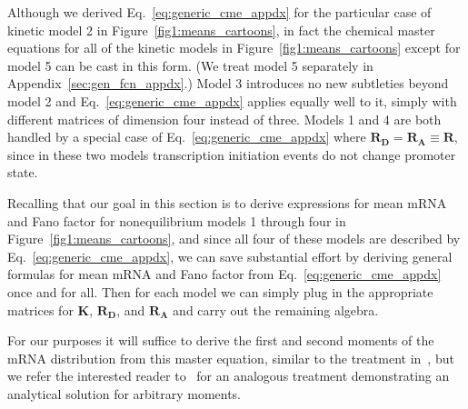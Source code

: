 Although we derived Eq.~\ref{eq:generic_cme_appdx} for the particular case of
kinetic model 2 in Figure~\ref{fig1:means_cartoons}, in fact the chemical master
equations for all of the kinetic models in Figure~\ref{fig1:means_cartoons}
except for model 5 can be cast in this form. (We treat model 5 separately in
Appendix~\ref{sec:gen_fcn_appdx}.) Model 3 introduces no new subtleties beyond
model 2 and Eq.~\ref{eq:generic_cme_appdx} applies equally well to it, simply
with different matrices of dimension four instead of three. Models 1 and 4 are
both handled by a special case of Eq.~\ref{eq:generic_cme_appdx} where
$\mathbf{R_D} = \mathbf{R_A} \equiv \mathbf{R}$, since in these two models
transcription initiation events do not change promoter state.

Recalling that our goal in this section is to derive expressions for mean mRNA
and Fano factor for nonequilibrium models 1 through four in
Figure~\ref{fig1:means_cartoons}, and since all four of these models are
described by Eq.~\ref{eq:generic_cme_appdx}, we can save substantial effort by
deriving general formulas for mean mRNA and Fano factor from
Eq.~\ref{eq:generic_cme_appdx} once and for all. Then for each model we can
simply plug in the appropriate matrices for $\mathbf{K}$, $\mathbf{R_D}$, and
$\mathbf{R_A}$ and carry out the remaining algebra.

For our purposes it will suffice to derive the first and second moments of the
mRNA distribution from this master equation, similar to the treatment
in~\cite{Sanchez2011}, but we refer the interested reader
to~\cite{Razo-Mejia2020} for an analogous treatment demonstrating an analytical
solution for arbitrary moments.

